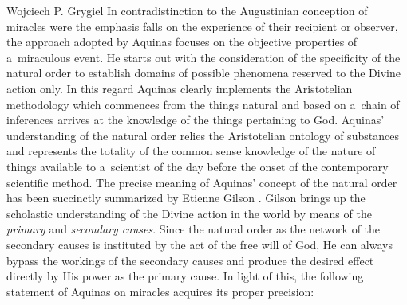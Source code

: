 \begin{artengenv}{Wojciech P. Grygiel}
In contradistinction to the Augustinian conception of miracles were the emphasis falls on the experience of their recipient or observer, the approach adopted by Aquinas focuses on the objective properties of a~miraculous event. He starts out with the consideration of the specificity of the natural order to establish domains of possible phenomena reserved to the Divine action only. In this regard Aquinas clearly implements the Aristotelian methodology which commences from the things natural and based on a~chain of inferences arrives at the knowledge of the things pertaining to God. Aquinas’ understanding of the natural order relies the Aristotelian ontology of substances and represents the totality of the common sense knowledge of the nature of things available to a~scientist of the day before the onset of the contemporary scientific method. The precise meaning of Aquinas’ concept of the natural order has been succinctly summarized by Etienne Gilson
\parencite*[][pp.376–377]{gilson_spirit_1991}. %
 Gilson brings up the scholastic understanding of the Divine action in the world by means of the \textit{primary} and \textit{secondary causes}. Since the natural order as the network of the secondary causes is instituted by the act of the free will of God, He can always bypass the workings of the secondary causes and produce the desired effect directly by His power as the primary cause. In light of this, the following statement of Aquinas on miracles acquires its proper precision:

\end{artengenv}
